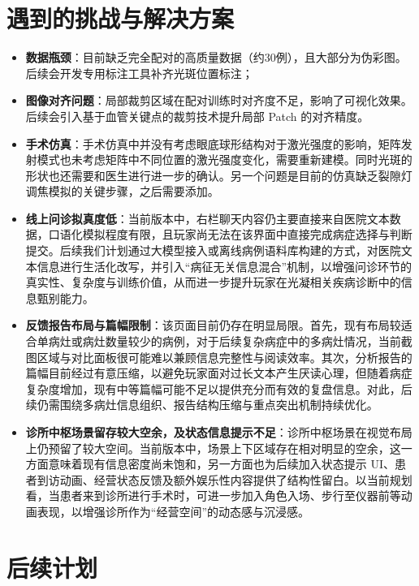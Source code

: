 \documentclass[12pt,a4paper]{ctexart}
\begin{document}
\section{遇到的挑战与解决方案}
\begin{itemize}
    \item \textbf{数据瓶颈}：目前缺乏完全配对的高质量数据（约30例），且大部分为伪彩图。后续会开发专用标注工具补齐光斑位置标注；
    \item \textbf{图像对齐问题}：局部裁剪区域在配对训练时对齐度不足，影响了可视化效果。后续会引入基于血管关键点的裁剪技术提升局部 Patch 的对齐精度。
    \item \textbf{手术仿真}：手术仿真中并没有考虑眼底球形结构对于激光强度的影响，矩阵发射模式也未考虑矩阵中不同位置的激光强度变化，需要重新建模。同时光斑的形状也还需要和医生进行进一步的确认。另一个问题是目前的仿真缺乏裂隙灯调焦模拟的关键步骤，之后需要添加。
    \item \textbf{线上问诊拟真度低}：当前版本中，右栏聊天内容仍主要直接来自医院文本数据，口语化模拟程度有限，且玩家尚无法在该界面中直接完成病症选择与判断提交。后续我们计划通过大模型接入或离线病例语料库构建的方式，对医院文本信息进行生活化改写，并引入“病征无关信息混合”机制，以增强问诊环节的真实性、复杂度与训练价值，从而进一步提升玩家在光凝相关疾病诊断中的信息甄别能力。
    \item \textbf{反馈报告布局与篇幅限制}：该页面目前仍存在明显局限。首先，现有布局较适合单病灶或病灶数量较少的病例，对于后续复杂病症中的多病灶情况，当前截图区域与对比面板很可能难以兼顾信息完整性与阅读效率。其次，分析报告的篇幅目前经过有意压缩，以避免玩家面对过长文本产生厌读心理，但随着病症复杂度增加，现有中等篇幅可能不足以提供充分而有效的复盘信息。对此，后续仍需围绕多病灶信息组织、报告结构压缩与重点突出机制持续优化。
    \item \textbf{诊所中枢场景留存较大空余，及状态信息提示不足}：诊所中枢场景在视觉布局上仍预留了较大空间。当前版本中，场景上下区域存在相对明显的空余，这一方面意味着现有信息密度尚未饱和，另一方面也为后续加入状态提示 UI、患者到访动画、经营状态反馈及额外娱乐性内容提供了结构性留白。以当前规划看，当患者来到诊所进行手术时，可进一步加入角色入场、步行至仪器前等动画表现，以增强诊所作为“经营空间”的动态感与沉浸感。
\end{itemize}

\section{后续计划}
\end{document}
